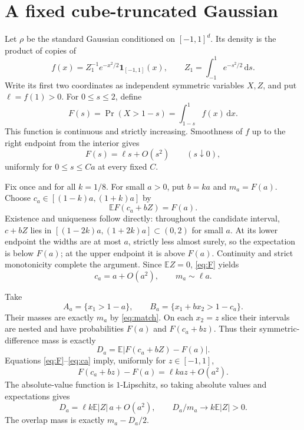 \documentclass[11pt]{article}
\theoremstyle{remark}\newtheorem{remark}[theorem]{Remark}
\newcommand{\E}{\mathbb E}
\newcommand{\ind}{\mathbf 1}
\newcommand{\dd}{\,\mathrm d}
\begin{document}
\section{A fixed cube-truncated Gaussian}
Let $\rho$ be the standard Gaussian conditioned on $[-1,1]^d$.
Its density is the product of copies of
\[
 f(x)=Z_1^{-1}e^{-x^2/2}\ind_{[-1,1]}(x),\qquad
 Z_1=\int_{-1}^1 e^{-s^2/2}\dd s.
\]
Write its first two coordinates as independent symmetric variables
$X,Z$, and put $\ell=f(1)>0$. For $0\le s\le2$, define
\[
 F(s)=\Pr(X>1-s)=\int_{1-s}^1 f(x)\dd x.
\]
This function is continuous and strictly increasing. Smoothness of
$f$ up to the right endpoint from the interior gives
\begin{equation}\label{eq:F}
 F(s)=\ell s+O(s^2)\qquad(s\downarrow0),
\end{equation}
uniformly for $0\le s\le Ca$ at every fixed $C$.

Fix once and for all $k=1/8$. For small $a>0$, put $b=ka$ and
$m_a=F(a)$. Choose $c_a\in[(1-k)a,(1+k)a]$ by
\begin{equation}\label{eq:match}
 \E F(c_a+bZ)=F(a).
\end{equation}
Existence and uniqueness follow directly: throughout the candidate
interval, $c+bZ$ lies in $[(1-2k)a,(1+2k)a]\subset(0,2)$ for small
$a$. At its lower endpoint the widths are at most $a$, strictly
less almost surely, so the expectation is below $F(a)$; at the
upper endpoint it is above $F(a)$. Continuity and strict monotonicity
complete the argument. Since $\E Z=0$, \eqref{eq:F} yields
\begin{equation}\label{eq:ca}
 c_a=a+O(a^2),\qquad m_a\sim\ell a.
\end{equation}

Take
\[
 A_a=\{x_1>1-a\},\qquad
 B_a=\{x_1+b x_2>1-c_a\}.
\]
Their masses are exactly $m_a$ by \eqref{eq:match}. On each
$x_2=z$ slice their intervals are nested and have probabilities
$F(a)$ and $F(c_a+bz)$. Thus their symmetric-difference mass is exactly
\begin{equation}\label{eq:D}
 D_a=\E|F(c_a+bZ)-F(a)|.
\end{equation}
Equations \eqref{eq:F}--\eqref{eq:ca} imply, uniformly for
$z\in[-1,1]$,
\[
 F(c_a+bz)-F(a)=\ell k a z+O(a^2).
\]
The absolute-value function is $1$-Lipschitz, so taking absolute
values and expectations gives
\begin{equation}\label{eq:Dasymptotic}
 D_a=\ell k\E|Z|\,a+O(a^2),\qquad
 D_a/m_a\longrightarrow k\E|Z|>0.
\end{equation}
The overlap mass is exactly $m_a-D_a/2$.
\end{document}
